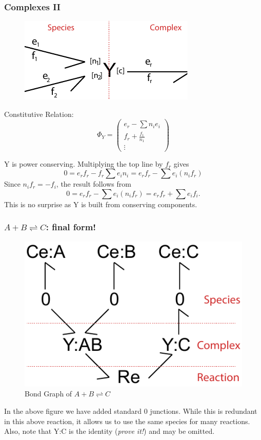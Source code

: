 \documentclass[10pt,reqno]{beamer}
\begin{document}
\begin{frame}
\frametitle{Complexes II}
\begin{minipage}{0.58\textwidth}
\begin{figure}
	\includegraphics{images/stoic_Ya}
\end{figure}
\end{minipage}
\begin{minipage}{0.38\textwidth}
Constitutive Relation:
\[
\Phi_{Y} = \left(\begin{matrix}
e_r - \sum n_ie_i \\
f_r + \frac{f_1}{n_1}\\
\vdots
\end{matrix}\right)
\]
\end{minipage}

\vspace{20pt}

$\text{Y}$ is power conserving. Multiplying the top line by $f_r$ gives 
\[
0 = e_r f_r - f_r\sum e_i n_i  =e_r f_r - \sum e_i (n_if_r)
\]
Since $n_if_r = -f_i$, the result follows from
\[
0 = e_r f_r - \sum e_i (n_if_r) = e_rf_r + \sum e_if_i.
\]
This is no surprise as $\text{Y}$ is built from conserving components.

\end{frame}
\begin{frame}
\frametitle{$A+B\rightleftharpoons C$: final form!}
\begin{figure}
	\includegraphics[scale=0.75]{images/bondgraph_abc}
	\caption{Bond Graph of $A+B \rightleftharpoons C$}
\end{figure}
In the above figure we have added standard 0 junctions. While this is redundant in this above reaction, it allows us to use the same species for many reactions.
Also, note that $\text{Y:C}$ is the identity (\emph{prove it!}) and may be omitted.
\end{frame}
\end{document}
